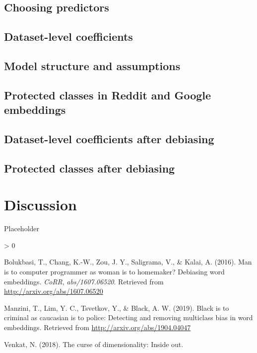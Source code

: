 \documentclass[
  12pt,
]{book}
\newlength{\cslhangindent}
\newenvironment{CSLReferences}[2] %
 {%
  \setlength{\parindent}{0pt}
  \ifodd #1 \everypar{\setlength{\hangindent}{\cslhangindent}}\ignorespaces\fi
  \ifnum #2 > 0
  \setlength{\parskip}{#2\baselineskip}
  \fi
 }%
 {}
\begin{document}
\hypertarget{choosing-predictors}{%
\section{Choosing predictors}\label{choosing-predictors}}

\hypertarget{dataset-level-coefficients}{%
\section{Dataset-level coefficients}\label{dataset-level-coefficients}}

\hypertarget{model-structure-and-assumptions}{%
\section{Model structure and assumptions}\label{model-structure-and-assumptions}}

\hypertarget{protected-classes-in-reddit-and-google-embeddings}{%
\section{Protected classes in Reddit and Google embeddings}\label{protected-classes-in-reddit-and-google-embeddings}}

\hypertarget{dataset-level-coefficients-after-debiasing}{%
\section{Dataset-level coefficients after debiasing}\label{dataset-level-coefficients-after-debiasing}}

\hypertarget{protected-classes-after-debiasing}{%
\section{Protected classes after debiasing}\label{protected-classes-after-debiasing}}

\hypertarget{discussion}{%
\chapter{Discussion}\label{discussion}}

Placeholder

\hypertarget{refs}{}
\begin{CSLReferences}{1}{0}
\leavevmode\hypertarget{ref-Bolukbasi2016Man}{}%
Bolukbasi, T., Chang, K.-W., Zou, J. Y., Saligrama, V., \& Kalai, A. (2016). Man is to computer programmer as woman is to homemaker? Debiasing word embeddings. \emph{CoRR}, \emph{abs/1607.06520}. Retrieved from \url{http://arxiv.org/abs/1607.06520}

\leavevmode\hypertarget{ref-Manzini2019blackToCriminal}{}%
Manzini, T., Lim, Y. C., Tsvetkov, Y., \& Black, A. W. (2019). Black is to criminal as caucasian is to police: Detecting and removing multiclass bias in word embeddings. Retrieved from \url{http://arxiv.org/abs/1904.04047}

\leavevmode\hypertarget{ref-Venkat2018Curse}{}%
Venkat, N. (2018). The curse of dimensionality: Inside out.

\end{CSLReferences}
\end{document}
